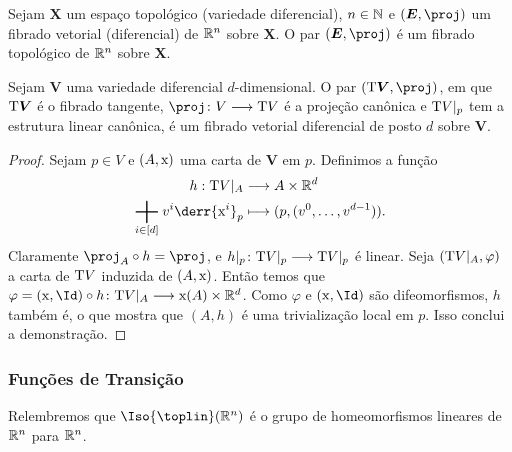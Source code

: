 \begin{prop}
Sejam $\bm X$ um espaço topológico (variedade diferencial), $n \in \mathbb{N}$ e $(\bm E,\proj)$ um fibrado vetorial (diferencial) de $\mathbb{R}^n$ sobre $\bm X$. O par $(\bm E,\proj)$ é um fibrado topológico de $\mathbb{R}^n$ sobre $\bm X$.
\end{prop}

\begin{prop}
Sejam $\bm V$ uma variedade diferencial $d$-dimensional. O par $(\Tg \bm V,\proj)$, em que $\mathrm{T} \bm V$ é o fibrado tangente, $\proj\colon V \to \Tg V$ é a projeção canônica e $\mathrm{T} V|_p$ tem a estrutura linear canônica, é um fibrado vetorial diferencial de posto $d$ sobre $\bm V$.
\end{prop}
\begin{proof}
Sejam $p \in V$ e $(A,\mathrm{x})$ uma carta de $\bm V$ em $p$. Definimos a função
	\begin{align*}
	\func{h}{\Tg V|_A}{A \times \R^d}{\sum_{i \in [d]} v^i \derr{\x^i}_p}{(p,(v^0,\ldots,v^{d-1}))}.
	\end{align*}
Claramente $\proj_A \circ h = \proj$, e $h|_p\colon \mathrm{T} V|_p \longrightarrow \mathrm{T} V|_p$ é linear. Seja $(\mathrm{T} V|_A,\varphi)$ a carta de $\mathrm{T} V$ induzida de $(A,\mathrm{x})$. Então temos que $\varphi = (\x,\Id) \circ h\colon \Tg V|_A \to \x(A) \times \R^d$. Como $\varphi$ e $(\x,\Id)$ são difeomorfismos, $h$ também é, o que mostra que $(A,h)$ é uma trivialização local em $p$. Isso conclui a demonstração.
\end{proof}

\subsubsection{Funções de Transição}

Relembremos que $\Iso{\toplin}(\R^n)$ é o grupo de homeomorfismos lineares de $\mathbb{R}^n$ para $\mathbb{R}^n$.


